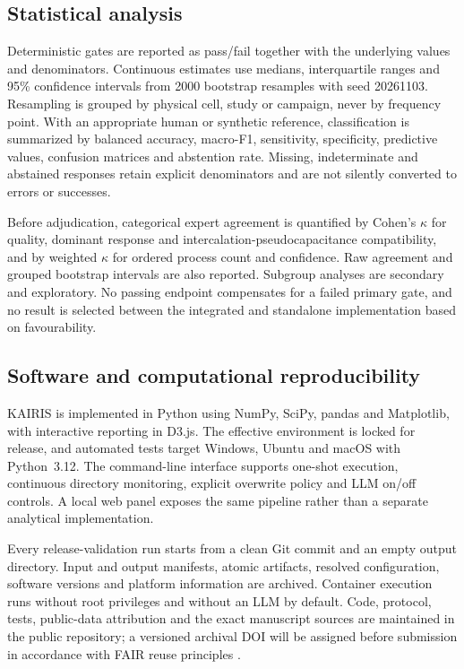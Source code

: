 \documentclass[a4paper,fleqn]{cas-sc}
\begin{document}
\subsection{Statistical analysis}\label{sec:statistics}

Deterministic gates are reported as pass/fail together with the underlying
values and denominators. Continuous estimates use medians, interquartile ranges
and 95\% confidence intervals from 2000 bootstrap resamples with seed 20261103.
Resampling is grouped by physical cell, study or campaign, never by frequency
point. With an appropriate human or synthetic reference, classification is
summarized by balanced accuracy, macro-F1, sensitivity, specificity, predictive
values, confusion matrices and abstention rate. Missing, indeterminate and
abstained responses retain explicit denominators and are not silently converted
to errors or successes.

Before adjudication, categorical expert agreement is quantified by Cohen's
$\kappa$ for quality, dominant response and intercalation-pseudocapacitance
compatibility, and by weighted $\kappa$ for ordered process count and confidence.
Raw agreement and grouped bootstrap intervals are also reported. Subgroup
analyses are secondary and exploratory. No passing endpoint compensates for a
failed primary gate, and no result is selected between the integrated and
standalone implementation based on favourability.

\subsection{Software and computational reproducibility}\label{sec:software}

KAIRIS is implemented in Python using NumPy, SciPy, pandas and Matplotlib, with
interactive reporting in D3.js. The effective environment is locked for release,
and automated tests target Windows, Ubuntu and macOS with Python~3.12. The
command-line interface supports one-shot execution, continuous directory
monitoring, explicit overwrite policy and LLM on/off controls. A local web panel
exposes the same pipeline rather than a separate analytical implementation.

Every release-validation run starts from a clean Git commit and an empty output
directory. Input and output manifests, atomic artifacts, resolved configuration,
software versions and platform information are archived. Container execution
runs without root privileges and without an LLM by default. Code, protocol,
tests, public-data attribution and the exact manuscript sources are maintained
in the public repository; a versioned archival DOI will be assigned before
submission in accordance with FAIR reuse principles \cite{Wilkinson2016FAIR}.
\end{document}
